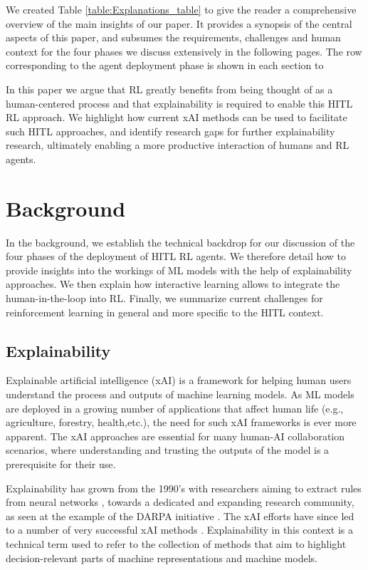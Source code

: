 \documentclass[twoside,11pt]{article}
\begin{document}
We created  Table \ref{table:Explanations_table} to give the reader a comprehensive overview of the main insights of our paper. It provides a synopsis of the central aspects of this paper, and subsumes the requirements, challenges and human context for the four phases we discuss extensively in the following pages. The row corresponding to the agent deployment phase is shown in each section to 

In this paper we argue that RL greatly benefits from being thought of as a human-centered process and that explainability is required to enable this HITL RL approach. We highlight how current xAI methods can be used to facilitate such HITL approaches, and identify 
research gaps for further explainability research, ultimately enabling a more productive interaction of humans and RL agents.

\section{Background}
\label{sec:background}

In the background, we establish the technical backdrop for our discussion of the four phases of the deployment of HITL RL agents. We therefore detail how to provide insights into the workings of ML models with the help of explainability approaches. We then explain how interactive learning allows to integrate the human-in-the-loop into RL. Finally, we summarize current challenges for reinforcement learning in general and more specific to the HITL context.

\subsection{Explainability}

Explainable artificial intelligence (xAI) is a framework for helping human users understand the process and outputs of machine learning models. As ML models are deployed in a growing number of applications that affect human life (e.g., agriculture, forestry, health,etc.), the need for such xAI frameworks is ever more apparent. The xAI approaches are essential for many human-AI collaboration scenarios, where understanding and trusting the outputs of the model is a prerequisite for their use.  

Explainability has grown from the 1990's with researchers aiming to extract rules from neural networks \citep{TickleEtAl:1998:HistoryNN}, towards a dedicated and expanding research community, as seen at the example of the DARPA initiative \citep{GunningAha:2019:DARPA}. The xAI efforts have since led to a number of very successful xAI methods \citep{HolzWoj:2022:XAIOverview, ZhouEtAl:2021:QualitySurvey}. Explainability in this context is a technical term used to refer to the collection of methods that aim to highlight decision-relevant parts of machine representations and machine models.
\end{document}
